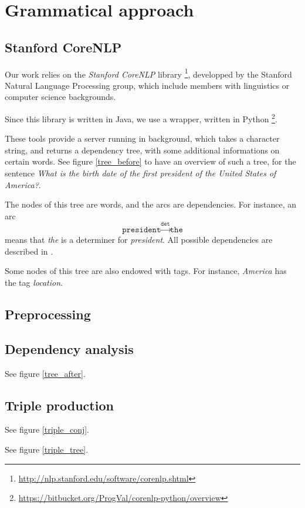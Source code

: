 \section{Grammatical approach}

\subsection{Stanford CoreNLP}

Our work relies on the \emph{Stanford CoreNLP} library
\footnote{\url{http://nlp.stanford.edu/software/corenlp.shtml}}, developped by
the Stanford Natural Language Processing group, which include members with 
linguistics or computer science backgrounds. 

Since this library is written in Java, we use a wrapper, written in Python
\footnote{\url{https://bitbucket.org/ProgVal/corenlp-python/overview}}.

These tools provide a server running in background, which takes a character string,
and returns a dependency tree, with some additional informations on certain words.
See figure \ref{tree_before} to have an overview of such a tree, for the sentence
\emph{What is the birth date of the first president of the United States of America?}.

The nodes of this tree are words, and the arcs are dependencies. For instance,
an arc $$\texttt{president}\xrightarrow{\texttt{det}}\texttt{the}$$ means that
\emph{the} is a determiner for \emph{president}. All possible dependencies are 
described in \cite{stanfordDep}. 

Some nodes of this tree are also endowed with tags. For instance, \emph{America}
has the tag \emph{location}.


\subsection{Preprocessing}


\subsection{Dependency analysis}

See figure \ref{tree_after}.


\subsection{Triple production}

See figure \ref{triple_conj}.

See figure \ref{triple_tree}.
